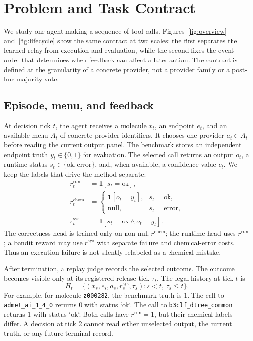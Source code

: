 \documentclass[sigconf,anonymous]{aamas}
\begin{document}
\section{Problem and Task Contract}
We study one agent making a sequence of tool calls. Figures~\ref{fig:overview} and~\ref{fig:lifecycle} show the same contract at two scales: the first separates the learned relay from execution and evaluation, while the second fixes the event order that determines when feedback can affect a later action. The contract is defined at the granularity of a concrete provider, not a provider family or a post-hoc majority vote.

\subsection{Episode, menu, and feedback}
At decision tick $t$, the agent receives a molecule $x_t$, an endpoint $e_t$, and an available menu $A_t$ of concrete provider identifiers. It chooses one provider $a_t\in A_t$ before reading the current output panel. The benchmark stores an independent endpoint truth $y_t\in\{0,1\}$ for evaluation. The selected call returns an output $o_t$, a runtime status $s_t\in\{\mathrm{ok},\mathrm{error}\}$, and, when available, a confidence value $c_t$. We keep the labels that drive the method separate:
$$
\begin{aligned}
 r_t^{\mathrm{run}}&=\mathbf{1}[s_t=\mathrm{ok}],\\
 r_t^{\mathrm{chem}}&=\begin{cases}\mathbf{1}[o_t=y_t],&s_t=\mathrm{ok},\\ \mathrm{null},&s_t=\mathrm{error},\end{cases}\\
 r_t^{\mathrm{sys}}&=\mathbf{1}[s_t=\mathrm{ok}\land o_t=y_t].
\end{aligned}
$$
The correctness head is trained only on non-null $r^{\mathrm{chem}}$; the runtime head uses $r^{\mathrm{run}}$; a bandit reward may use $r^{\mathrm{sys}}$ with separate failure and chemical-error costs. Thus an execution failure is not silently relabeled as a chemical mistake.

After termination, a replay judge records the selected outcome. The outcome becomes visible only at its registered release tick $\tau_t$. The legal history at tick $t$ is
$$
H_t=\{(x_s,e_s,a_s,r_s^{\mathrm{sys}},\tau_s):s<t,\ \tau_s\leq t\}.
$$
For example, for molecule \texttt{z000282}, the benchmark truth is $1$. The call to \texttt{admet\_ai\_1\_4\_0} returns $0$ with status `ok`. The call to \texttt{b3clf\_dtree\_common} returns $1$ with status `ok`. Both calls have $r^{\mathrm{run}}=1$, but their chemical labels differ. A decision at tick 2 cannot read either unselected output, the current truth, or any future terminal record.
\end{document}
